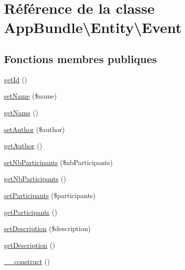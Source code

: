 \hypertarget{classAppBundle_1_1Entity_1_1Event}{}\section{Référence de la classe App\+Bundle\textbackslash{}Entity\textbackslash{}Event}
\label{classAppBundle_1_1Entity_1_1Event}
\subsection*{Fonctions membres publiques}
\begin{DoxyCompactItemize}
\item 
\hyperlink{classAppBundle_1_1Entity_1_1Event_a6114bdcf3b095f77e8149d7b996c4d6d}{get\+Id} ()
\item 
\hyperlink{classAppBundle_1_1Entity_1_1Event_a834c71ca866cd9a1e88e5fcd105ef187}{set\+Name} (\$name)
\item 
\hyperlink{classAppBundle_1_1Entity_1_1Event_a342d43c67caedb66f9a0f87a0edf5e11}{get\+Name} ()
\item 
\hyperlink{classAppBundle_1_1Entity_1_1Event_ad9c16e367f4296df5b6dac59e1907c8c}{set\+Author} (\$author)
\item 
\hyperlink{classAppBundle_1_1Entity_1_1Event_a5a717cc787d1c40bdcb32ebf0c31b4c4}{get\+Author} ()
\item 
\hyperlink{classAppBundle_1_1Entity_1_1Event_a3d39550bcf4a114ebac3a021745d281f}{set\+Nb\+Participants} (\$nb\+Participants)
\item 
\hyperlink{classAppBundle_1_1Entity_1_1Event_a127aed01a9e943cdce793bf28a62032c}{get\+Nb\+Participants} ()
\item 
\hyperlink{classAppBundle_1_1Entity_1_1Event_a2104abbe1e799f1d01fa880a556c4b57}{set\+Participants} (\$participants)
\item 
\hyperlink{classAppBundle_1_1Entity_1_1Event_ad13574598ee9b60c47f5b3c7b4215d51}{get\+Participants} ()
\item 
\hyperlink{classAppBundle_1_1Entity_1_1Event_ab97fe1479bede8949391c7ade9112406}{set\+Description} (\$description)
\item 
\hyperlink{classAppBundle_1_1Entity_1_1Event_acfad608d5e348b26bc8b6646483d35b8}{get\+Description} ()
\item 
\hyperlink{classAppBundle_1_1Entity_1_1Event_ad738c33b2824cc1130b06c5bc7ace4d9}{\+\_\+\+\_\+construct} ()
\item 

\end{DoxyCompactItemize}
